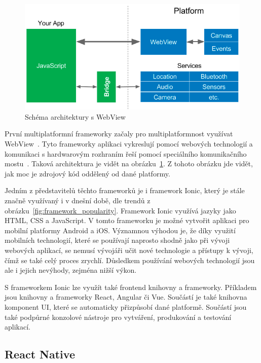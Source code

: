 \begin{figure}[ht!]
    \centering
    \includegraphics[width=\linewidth]{assets/technology-research/framework/webview.png}
    \caption{Schéma architektury s WebView
    ~\cite{hackernoon_flutter}}
    \label{fig:framework_webview}
\end{figure}

První multiplatformní frameworky začaly pro multiplatformnost využívat
WebView~\cite{hackernoon_flutter}.
Tyto frameworky aplikaci vykreslují pomocí webových technologií
a komunikaci s hardwarovým rozhraním řeší pomocí speciálního komunikačního
mostu~\cite{hackernoon_flutter}.
Taková architektura je vidět na obrázku~\ref{fig:framework_webview}.
Z tohoto obrázku jde vidět,
jak moc je zdrojový kód oddělený od dané platformy.

Jedním z představitelů těchto frameworků je i framework Ionic,
který je stále značně využívaný i v dnešní době,
dle trendů z obrázku~\ref{fig:framework_popularity}.
Framework Ionic využívá jazyky jako HTML, CSS a JavaScript.
V tomto frameworku je možné vytvořit aplikaci pro mobilní platformy
Android a iOS.
Významnou výhodou je,
že díky využití mobilních technologií,
které se používají naprosto shodně jako při vývoji webových aplikací,
se nemusí vývojáři učit nové technologie a přístupy k vývoji,
čímž se také celý proces zrychlí.
Důsledkem používání webových technologií jsou ale i jejich nevýhody,
zejména nižší výkon.~\cite{dashmagazine_mobile_frameworks}

S frameworkem Ionic lze využít také frontend knihovny a frameworky.
Příkladem jsou knihovny a frameworky React, Angular či Vue.
Součástí je také knihovna komponent UI,
které se automaticky přizpůsobí dané platformě.
Součástí jsou také podpůrné konzolové nástroje pro vytváření, produkování a
testování aplikací.~\cite{ionic}

\subsection{React Native}

